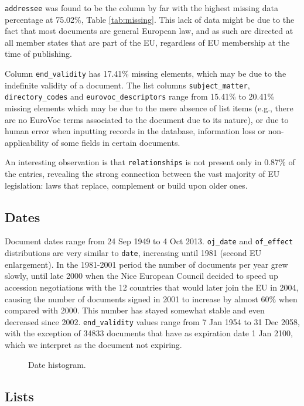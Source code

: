 \documentclass[sigconf, authorversion]{acmart}
\begin{document}
\texttt{addressee} was found to be the column by far with the highest missing data percentage at 75.02\%, Table \ref{tab:missing}. This lack of data might be due to the fact that most documents are general European law, and as such are directed at all member states that are part of the EU, regardless of EU membership at the time of publishing.

Column \texttt{end\_validity} has 17.41\% missing elements, which may be due to the indefinite validity of a document. The list columns \texttt{subject\_matter}, \texttt{directory\_codes} and \texttt{eurovoc\_descriptors} range from 15.41\% to 20.41\% missing elements which may be due to the mere absence of list items (e.g., there are no EuroVoc terms associated to the document due to its nature), or due to human error when inputting records in the database, information loss or non-applicability of some fields in certain documents.\par

An interesting observation is that \texttt{relationships} is not present only in 0.87\% of the entries, revealing the strong connection between the vast majority of EU legislation: laws that replace, complement or build upon older ones.

\subsection{Dates}

Document dates range from 24 Sep 1949 to 4 Oct 2013. \texttt{oj\_date} and \texttt{of\_effect} distributions are very similar to \texttt{date}, increasing until 1981 (second EU enlargement). In the 1981-2001 period the number of documents per year grew slowly, until late 2000 when the Nice European Council decided to speed up accession negotiations with the 12 countries that would later join the EU in 2004, causing the number of documents signed in 2001 to increase by almost $60\%$ when compared with 2000. 
This number has stayed somewhat stable and even decreased since 2002. \texttt{end\_validity} values range from 7 Jan 1954 to 31 Dec 2058, with the exception of \SI{34833}{} documents that have as expiration date 1 Jan 2100, which we interpret as the document not expiring.

\begin{figure}[H]
  
  \caption{Date histogram.}
\end{figure}

\subsection{Lists}
\end{document}
